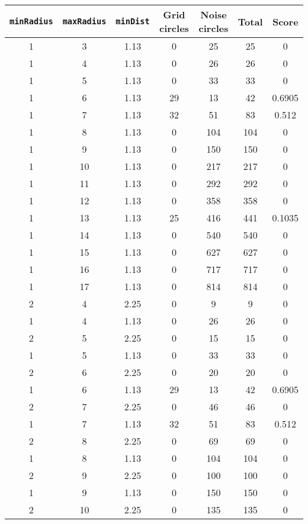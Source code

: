 \documentclass[letterpaper, 12pt]{article}
\begin{document}
\begin{longtable}{|c|c|c|c|c|c|c|}
\hline
\textbf{\texttt{minRadius}} & \textbf{\texttt{maxRadius}} & \textbf{\texttt{minDist}} & \textbf{Grid circles} & \textbf{Noise circles} & \textbf{Total} & \textbf{Score} \\
\hline
1 & 3 & 1.13 & 0 & 25 & 25 & 0 \\
\hline
1 & 4 & 1.13 & 0 & 26 & 26 & 0 \\
\hline
1 & 5 & 1.13 & 0 & 33 & 33 & 0 \\
\hline
1 & 6 & 1.13 & 29 & 13 & 42 & 0.6905 \\
\hline
1 & 7 & 1.13 & 32 & 51 & 83 & 0.512 \\
\hline
1 & 8 & 1.13 & 0 & 104 & 104 & 0 \\
\hline
1 & 9 & 1.13 & 0 & 150 & 150 & 0 \\
\hline
1 & 10 & 1.13 & 0 & 217 & 217 & 0 \\
\hline
1 & 11 & 1.13 & 0 & 292 & 292 & 0 \\
\hline
1 & 12 & 1.13 & 0 & 358 & 358 & 0 \\
\hline
1 & 13 & 1.13 & 25 & 416 & 441 & 0.1035 \\
\hline
1 & 14 & 1.13 & 0 & 540 & 540 & 0 \\
\hline
1 & 15 & 1.13 & 0 & 627 & 627 & 0 \\
\hline
1 & 16 & 1.13 & 0 & 717 & 717 & 0 \\
\hline
1 & 17 & 1.13 & 0 & 814 & 814 & 0 \\
\hline
2 & 4 & 2.25 & 0 & 9 & 9 & 0 \\
\hline
1 & 4 & 1.13 & 0 & 26 & 26 & 0 \\
\hline
2 & 5 & 2.25 & 0 & 15 & 15 & 0 \\
\hline
1 & 5 & 1.13 & 0 & 33 & 33 & 0 \\
\hline
2 & 6 & 2.25 & 0 & 20 & 20 & 0 \\
\hline
1 & 6 & 1.13 & 29 & 13 & 42 & 0.6905 \\
\hline
2 & 7 & 2.25 & 0 & 46 & 46 & 0 \\
\hline
1 & 7 & 1.13 & 32 & 51 & 83 & 0.512 \\
\hline
2 & 8 & 2.25 & 0 & 69 & 69 & 0 \\
\hline
1 & 8 & 1.13 & 0 & 104 & 104 & 0 \\
\hline
2 & 9 & 2.25 & 0 & 100 & 100 & 0 \\
\hline
1 & 9 & 1.13 & 0 & 150 & 150 & 0 \\
\hline
2 & 10 & 2.25 & 0 & 135 & 135 & 0 \\

\end{longtable}
\end{document}
